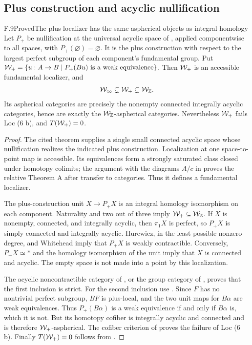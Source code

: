 \subsection{Plus construction and acyclic nullification}

\begin{claim}{F.9}{Proved}{The plus localizer has the same aspherical objects as integral homology}
Let $P_+$ be nullification at the universal acyclic space of
\citet[Theorem 4.3]{FBerrickCasacuberta1999}, applied componentwise to all
spaces, with $P_+(\varnothing)=\varnothing$. It is the plus construction
with respect to the largest perfect subgroup of each component's fundamental
group. Put
$\mathcal{W}_+=\{u:A\to B\mid P_+(Bu)\text{ is a weak equivalence}\}$.
Then $\mathcal{W}_+$ is an accessible fundamental localizer, and
\[
 \mathcal{W}_{\infty}\subsetneq\mathcal{W}_+\subsetneq\mathcal{W}_{\mathbb Z}.
\]
Its aspherical categories are precisely the nonempty connected integrally
acyclic categories, hence are exactly the $\mathcal{W}_{\mathbb Z}$-aspherical categories.
Nevertheless $\mathcal{W}_+$ fails Loc (6 b), and $T(\mathcal{W}_+)=0$.
\end{claim}
\begin{proof}
The cited theorem supplies a single small connected acyclic space whose
nullification realizes the indicated plus construction. Localization at one
space-to-point map is accessible. Its equivalences form a strongly saturated
class closed under homotopy colimits; the argument with the diagrams
$A/c$ in  proves the relative Theorem A after transfer to
categories. Thus it defines a fundamental localizer.

The plus-construction unit $X\to P_+X$ is an integral homology isomorphism
on each component. Naturality and two out of three imply
$\mathcal{W}_+\subseteq\mathcal{W}_{\mathbb Z}$. If $X$ is nonempty, connected, and integrally
acyclic, then $\pi_1X$ is perfect, so $P_+X$ is simply connected and
integrally acyclic. Hurewicz, in the least possible nonzero degree, and
Whitehead imply that $P_+X$ is weakly contractible. Conversely,
$P_+X\simeq *$ and the homology isomorphism of the unit imply that $X$
is connected and acyclic. The empty space is not made into a point by
this localization.

The acyclic noncontractible category of , or the group
category of , proves that the first inclusion is strict.
For the second inclusion use . Since $F$ has no nontrivial
perfect subgroup, $BF$ is plus-local, and the two unit maps for $B\alpha$
are weak equivalences. Thus $P_+(B\alpha)$ is a weak equivalence if and
only if $B\alpha$ is, which it is not. But its homotopy cofiber is
integrally acyclic and connected and is therefore $\mathcal{W}_+$-aspherical.
The cofiber criterion of  proves the failure of Loc (6 b).
Finally $T(\mathcal{W}_+)=0$ follows from .
\end{proof}

